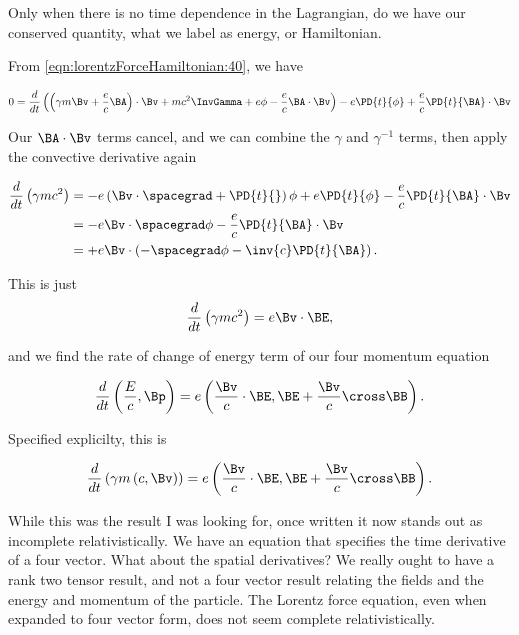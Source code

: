 Only when there is no time dependence in the Lagrangian, do we have our conserved quantity, what we label as energy, or Hamiltonian.

From \ref{eqn:lorentzForceHamiltonian:40}, we have

\begin{align*}
0 &= 
\frac{d}{dt} \left( 
\left( \gamma m \Bv + \frac{e}{c} \BA \right) \cdot \Bv 
+m c^2 \InvGamma + e \phi - \frac{e}{c} \BA \cdot \Bv
\right) 
- e \PD{t}{\phi} + \frac{e}{c} \PD{t}{\BA} \cdot \Bv \\
\end{align*}

Our $\BA \cdot \Bv$ terms cancel, and we can combine the $\gamma$ and $\gamma^{-1}$ terms, then apply the convective derivative again

\begin{align*}
\frac{d}{dt} \left( 
\gamma m c^2 
\right) 
&= 
- e \left( \Bv \cdot \spacegrad + \PD{t}{} \right) \phi 
+ e \PD{t}{\phi} - \frac{e}{c} \PD{t}{\BA} \cdot \Bv \\
&= 
- e \Bv \cdot \spacegrad \phi 
- \frac{e}{c} \PD{t}{\BA} \cdot \Bv \\
&= 
+ e \Bv \cdot \left( - \spacegrad \phi - \inv{c} \PD{t}{\BA} \right).
\end{align*}

This is just
\begin{equation}\label{eqn:lorentzForceHamiltonian:200}
\frac{d}{dt} \left( 
\gamma m c^2 
\right) 
= e \Bv \cdot \BE,
\end{equation}

and we find the rate of change of energy term of our four momentum equation

\begin{equation}\label{eqn:lorentzForceHamiltonian:220}
\frac{d}{dt}
\left( 
\frac{E}{c}, \Bp
\right) 
= e \left( \frac{\Bv}{c} \cdot \BE, \BE + \frac{\Bv}{c} \cross \BB \right).
\end{equation}

Specified explicilty, this is

\begin{equation}\label{eqn:lorentzForceHamiltonian:220b}
\frac{d}{dt}
\left( \gamma m \left( c, \Bv \right) \right)
= e \left( \frac{\Bv}{c} \cdot \BE, \BE + \frac{\Bv}{c} \cross \BB \right).
\end{equation}

While this was the result I was looking for, once written it now stands out as incomplete relativistically.  We have an equation that specifies the time derivative of a four vector.  What about the spatial derivatives?  We really ought to have a rank two tensor result, and not a four vector result relating the fields and the energy and momentum of the particle.  The Lorentz force equation, even when expanded to four vector form, does not seem complete relativistically.

